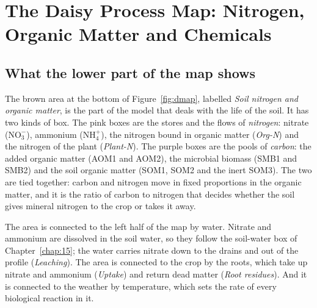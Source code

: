 \chapter{The Daisy Process Map: Nitrogen, Organic Matter and Chemicals}\label{chap:17}
\label{ch:map3}
\section{What the lower part of the map shows}
The brown area at the bottom of Figure~\ref{fig:dmap}, labelled \emph{Soil nitrogen and organic matter}, is the part of the model that deals with the life of the soil. It has two kinds of box. The pink boxes are the stores and the flows of \emph{nitrogen}: nitrate ($\mathrm{NO_3^-}$), ammonium ($\mathrm{NH_4^+}$), the nitrogen bound in organic matter (\emph{Org-N}) and the nitrogen of the plant (\emph{Plant-N}). The purple boxes are the pools of \emph{carbon}: the added organic matter (AOM1 and AOM2), the microbial biomass (SMB1 and SMB2) and the soil organic matter (SOM1, SOM2 and the inert SOM3). The two are tied together: carbon and nitrogen move in fixed proportions in the organic matter, and it is the ratio of carbon to nitrogen that decides whether the soil gives mineral nitrogen to the crop or takes it away.

\par\noindent The area is connected to the left half of the map by water. Nitrate and ammonium are dissolved in the soil water, so they follow the soil-water box of Chapter~\ref{chap:15}; the water carries nitrate down to the drains and out of the profile (\emph{Leaching}). The area is connected to the crop by the roots, which take up nitrate and ammonium (\emph{Uptake}) and return dead matter (\emph{Root residues}). And it is connected to the weather by temperature, which sets the rate of every biological reaction in it.

